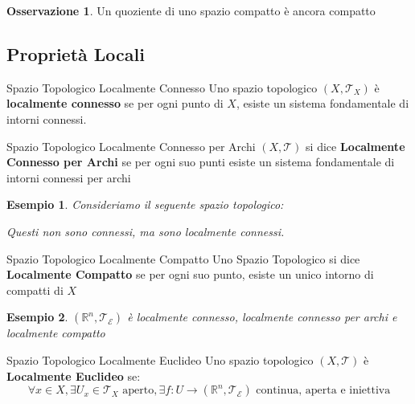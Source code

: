 \documentclass[11pt,a4paper,twoside]{article}
\newtheorem{es}{Esempio}
\theoremstyle{definition}
\newtheorem*{oss}{Osservazione}
\begin{document}
\begin{oss}
	Un quoziente di uno spazio compatto è ancora compatto
\end{oss}

\subsection{Proprietà Locali}

\begin{defn}{Spazio Topologico Localmente Connesso}{}
	Uno spazio topologico $(X, \mathcal T_X)$ è \textbf{localmente connesso} se per ogni punto di $X$, esiste un sistema fondamentale di intorni connessi.
\end{defn}

\begin{defn}{Spazio Topologico Localmente Connesso per Archi}{}
	$(X, \mathcal T)$ si dice \textbf{Localmente Connesso per Archi} se per ogni suo punti esiste un sistema fondamentale di intorni connessi per archi
\end{defn}

\begin{es}
	Consideriamo il seguente spazio topologico:
	\begin{center}
	\end{center}
	Questi non sono connessi, ma sono localmente connessi.
\end{es}

\begin{defn}{Spazio Topologico Localmente Compatto}{}
	Uno Spazio Topologico si dice \textbf{Localmente Compatto} se per ogni suo punto, esiste un unico intorno di compatti di $X$
\end{defn}

\begin{es}
	$(\mathbb R^n, \mathcal T_\mathcal E)$ è localmente connesso, localmente connesso per archi e localmente compatto
\end{es}

\begin{defn}{Spazio Topologico Localmente Euclideo}{}
	Uno spazio topologico $(X, \mathcal T)$ è \textbf{Localmente Euclideo} se:
	\[\forall x \in X, \exists U_x \in \mathcal T_X \text{ aperto}, \exists f:U \to (\mathbb R^n, \mathcal T_\mathcal E)\text{ continua, aperta e iniettiva}\]
\end{defn}
\end{document}
